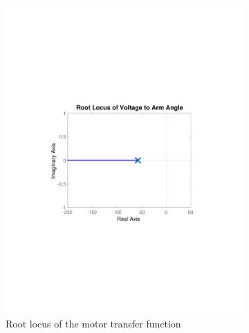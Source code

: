 \begin{figure}[htbp]
	\centering
	\begin{subfigure}{0.48\textwidth}
		\includegraphics[width=\textwidth]{figures/Design/MotorLoop/MotorRootLocus}
		\caption{Root locus of the motor transfer function}
		\label{fig:MotorRootLocus}
	\end{subfigure}
	\begin{subfigure}{0.5\textwidth}
		\centering

\end{subfigure}
\end{figure}

